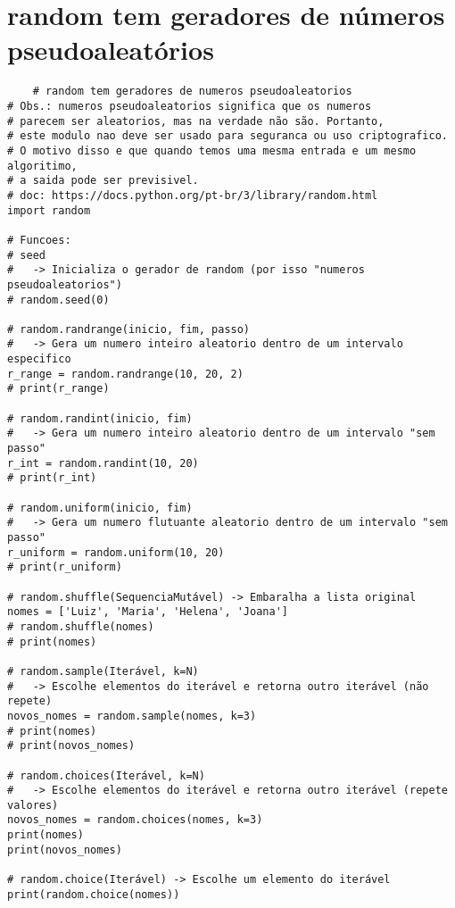 \documentclass{article}
\begin{document}
\section{random tem geradores de números pseudoaleatórios}
\begin{lstlisting}
    # random tem geradores de numeros pseudoaleatorios
# Obs.: numeros pseudoaleatorios significa que os numeros
# parecem ser aleatorios, mas na verdade não são. Portanto,
# este modulo nao deve ser usado para seguranca ou uso criptografico.
# O motivo disso e que quando temos uma mesma entrada e um mesmo algoritimo,
# a saida pode ser previsivel.
# doc: https://docs.python.org/pt-br/3/library/random.html
import random

# Funcoes:
# seed
#   -> Inicializa o gerador de random (por isso "numeros pseudoaleatorios")
# random.seed(0)

# random.randrange(inicio, fim, passo)
#   -> Gera um numero inteiro aleatorio dentro de um intervalo especifico
r_range = random.randrange(10, 20, 2)
# print(r_range)

# random.randint(inicio, fim)
#   -> Gera um numero inteiro aleatorio dentro de um intervalo "sem passo"
r_int = random.randint(10, 20)
# print(r_int)

# random.uniform(inicio, fim)
#   -> Gera um numero flutuante aleatorio dentro de um intervalo "sem passo"
r_uniform = random.uniform(10, 20)
# print(r_uniform)

# random.shuffle(SequenciaMutável) -> Embaralha a lista original
nomes = ['Luiz', 'Maria', 'Helena', 'Joana']
# random.shuffle(nomes)
# print(nomes)

# random.sample(Iterável, k=N)
#   -> Escolhe elementos do iterável e retorna outro iterável (não repete)
novos_nomes = random.sample(nomes, k=3)
# print(nomes)
# print(novos_nomes)

# random.choices(Iterável, k=N)
#   -> Escolhe elementos do iterável e retorna outro iterável (repete valores)
novos_nomes = random.choices(nomes, k=3)
print(nomes)
print(novos_nomes)

# random.choice(Iterável) -> Escolhe um elemento do iterável
print(random.choice(nomes))
\end{lstlisting}
\end{document}
